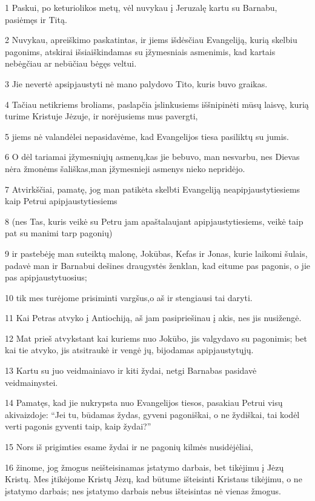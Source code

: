 \par 1 Paskui, po keturiolikos metų, vėl nuvykau į Jeruzalę kartu su Barnabu, pasiėmęs ir Titą. 
\par 2 Nuvykau, apreiškimo paskatintas, ir jiems išdėsčiau Evangeliją, kurią skelbiu pagonims, atskirai išsiaiškindamas su įžymesniais asmenimis, kad kartais nebėgčiau ar nebūčiau bėgęs veltui. 
\par 3 Jie nevertė apsipjaustyti nė mano palydovo Tito, kuris buvo graikas. 
\par 4 Tačiau netikriems broliams, paslapčia įslinkusiems iššnipinėti mūsų laisvę, kurią turime Kristuje Jėzuje, ir norėjusiems mus pavergti,­ 
\par 5 jiems nė valandėlei nepasidavėme, kad Evangelijos tiesa pasiliktų su jumis. 
\par 6 O dėl tariamai įžymesniųjų asmenų,­kas jie bebuvo, man nesvarbu, nes Dievas nėra žmonėms šališkas,­man įžymesnieji asmenys nieko nepridėjo. 
\par 7 Atvirkščiai, pamatę, jog man patikėta skelbti Evangeliją neapipjaustytiesiems kaip Petrui apipjaustytiesiems 
\par 8 (nes Tas, kuris veikė su Petru jam apaštalaujant apipjaustytiesiems, veikė taip pat su manimi tarp pagonių) 
\par 9 ir pastebėję man suteiktą malonę, Jokūbas, Kefas ir Jonas, kurie laikomi šulais, padavė man ir Barnabui dešines draugystės ženklan, kad eitume pas pagonis, o jie pas apipjaustytuosius; 
\par 10 tik mes turėjome prisiminti vargšus,­o aš ir stengiausi tai daryti. 
\par 11 Kai Petras atvyko į Antiochiją, aš jam pasipriešinau į akis, nes jis nusižengė. 
\par 12 Mat prieš atvykstant kai kuriems nuo Jokūbo, jis valgydavo su pagonimis; bet kai tie atvyko, jis atsitraukė ir vengė jų, bijodamas apipjaustytųjų. 
\par 13 Kartu su juo veidmainiavo ir kiti žydai, netgi Barnabas pasidavė veidmainystei. 
\par 14 Pamatęs, kad jie nukrypsta nuo Evangelijos tiesos, pasakiau Petrui visų akivaizdoje: “Jei tu, būdamas žydas, gyveni pagoniškai, o ne žydiškai, tai kodėl verti pagonis gyventi taip, kaip žydai?” 
\par 15 Nors iš prigimties esame žydai ir ne pagonių kilmės nusidėjėliai, 
\par 16 žinome, jog žmogus neišteisinamas įstatymo darbais, bet tikėjimu į Jėzų Kristų. Mes įtikėjome Kristų Jėzų, kad būtume išteisinti Kristaus tikėjimu, o ne įstatymo darbais; nes įstatymo darbais nebus išteisintas nė vienas žmogus. 

